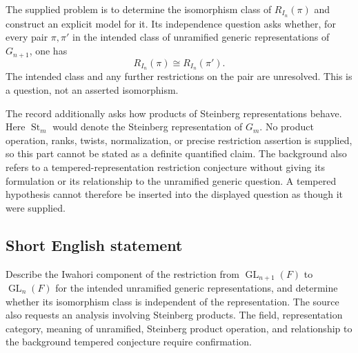 \documentclass[11pt]{article}
\begin{document}
The supplied problem is to determine the isomorphism class of \(R_{I_n}(\pi)\) and construct an explicit model for it. Its independence question asks whether, for every pair \(\pi,\pi'\) in the intended class of unramified generic representations of \(G_{n+1}\), one has
\[
R_{I_n}(\pi)\cong R_{I_n}(\pi').
\]
The intended class and any further restrictions on the pair are unresolved. This is a question, not an asserted isomorphism.

The record additionally asks how products of Steinberg representations behave. Here \(\operatorname{St}_m\) would denote the Steinberg representation of \(G_m\). No product operation, ranks, twists, normalization, or precise restriction assertion is supplied, so this part cannot be stated as a definite quantified claim. The background also refers to a tempered-representation restriction conjecture without giving its formulation or its relationship to the unramified generic question. A tempered hypothesis cannot therefore be inserted into the displayed question as though it were supplied.
\subsection{Short English statement}
Describe the Iwahori component of the restriction from \(\operatorname{GL}_{n+1}(F)\) to \(\operatorname{GL}_n(F)\) for the intended unramified generic representations, and determine whether its isomorphism class is independent of the representation. The source also requests an analysis involving Steinberg products. The field, representation category, meaning of unramified, Steinberg product operation, and relationship to the background tempered conjecture require confirmation.
\end{document}
